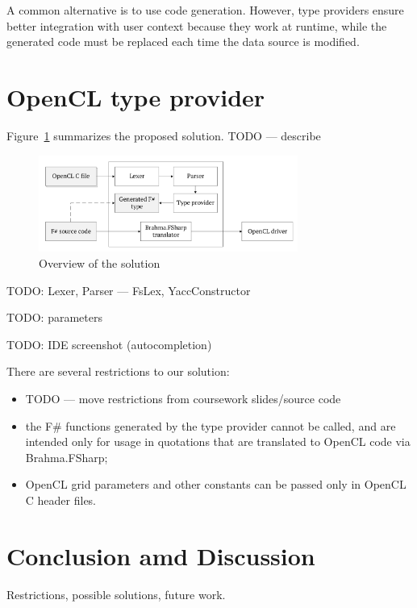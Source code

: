 \documentclass[sigplan,review]{acmart}\settopmatter{printfolios=true}
\begin{document}
A common alternative is to use code generation. However, type providers ensure better integration with user context because they work at runtime, while the generated code must be replaced each time the data source is modified.

\section{OpenCL type provider}

Figure~\ref{architecture} summarizes the proposed solution. TODO --- describe

\begin{figure}[h]
\centering
\includegraphics[width=8.5cm]{graphics/architecture.pdf}
\caption{Overview of the solution}
\label{architecture}
\end{figure}

TODO: Lexer, Parser --- FsLex, YaccConstructor

TODO: parameters

TODO: IDE screenshot (autocompletion)

There are several restrictions to our solution:
\begin{itemize}
    \item TODO --- move restrictions from coursework slides/source code
    \item the F\# functions generated by the type provider cannot be called, and are intended only for usage in quotations that are translated to OpenCL code via Brahma.FSharp;
    \item OpenCL grid parameters and other constants can be passed only in OpenCL C header files.
\end{itemize}

\section{Conclusion amd Discussion}

Restrictions, possible solutions, future work.
\end{document}
